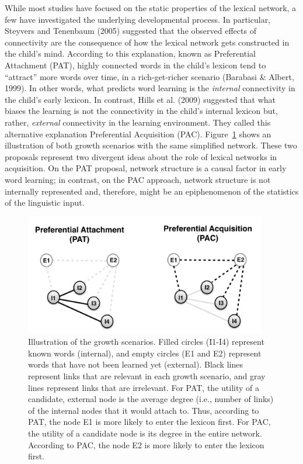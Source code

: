 \documentclass[english,floatsintext,man]{apa6}
\theoremstyle{definition}
\theoremstyle{definition}
\theoremstyle{definition}
\theoremstyle{remark}
\begin{document}
While most studies have focused on the static properties of the lexical
network, a few have investigated the underlying developmental process.
In particular, Steyvers and Tenenbaum (2005) suggested that the observed
effects of connectivity are the consequence of how the lexical network
gets constructed in the child's mind. According to this explanation,
known as Preferential Attachment (PAT), highly connected words in the
child's lexicon tend to \enquote{attract} more words over time, in a
rich-get-richer scenario (Barabasi \& Albert, 1999). In other words,
what predicts word learning is the \emph{internal} connectivity in the
child's early lexicon. In contrast, Hills et al. (2009) suggested that
what biases the learning is not the connectivity in the child's internal
lexicon but, rather, \emph{external} connectivity in the learning
environment. They called this alternative explanation Preferential
Acquisition (PAC). Figure~\ref{fig:growth} shows an illustration of both
growth scenarios with the same simplified network. These two proposals
represent two divergent ideas about the role of lexical networks in
acquisition. On the PAT proposal, network structure is a causal factor
in early word learning; in contrast, on the PAC approach, network
structure is not internally represented and, therefore, might be an
epiphenomenon of the statistics of the linguistic input.

\begin{figure}

{\centering \includegraphics[width=400px]{figs/growth2} 

}

\caption{Illustration of the growth scenarios. Filled circles (I1-I4) represent known words (internal), and empty circles (E1 and E2) represent words that have not been learned yet (external). Black lines represent links that are relevant in each growth scenario, and gray lines represent links that are irrelevant. For PAT, the utility of a candidate, external node is the average degree (i.e., number of links) of the internal nodes that it would attach to. Thus, according to PAT, the node E1 is more likely to enter the lexicon first. For PAC, the utility of a candidate node is its degree in the entire network. According to PAC, the node E2 is more likely to enter the lexicon first.}\label{fig:growth}
\end{figure}
\end{document}

